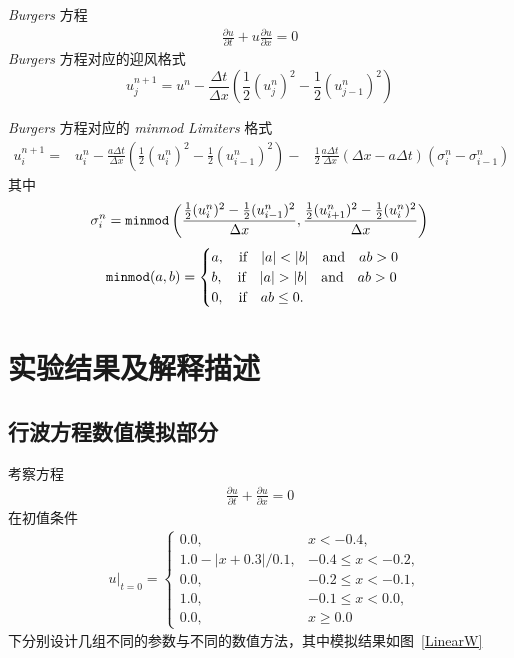 \documentclass[10.5pt
]{article}
\begin{document}
\textit{Burgers} 方程
\begin{align}
\frac{\partial u}{\partial t} + u \frac{\partial u}{\partial x} = 0
\end{align}
\textit{Burgers} 方程对应的迎风格式
\begin{equation}
u_j^{n+1} = u^n - \frac{\Delta t}{\Delta x} \left( \frac{1}{2} (u_j^n)^2 - \frac{1}{2} (u_{j-1}^n)^2\right)
\end{equation}

\textit{Burgers} 方程对应的 \textit{minmod Limiters} 格式
\begin{equation}
\begin{aligned}
u_i^{n+1}=&
  u_i^n-\frac{a \Delta t}{\Delta x}\left( \frac{1}{2} (u_i^n)^2- \frac{1}{2} (u_{i-1}^n)^2 \right)-
 &\frac{1}{2} \frac{a \Delta t}{\Delta x}(\Delta x-a \Delta t)\left(\sigma_i^n-\sigma_{i-1}^n\right)
\end{aligned}
\end{equation}
其中
\begin{equation}
	\sigma_i^n = \verb|minmod| \left( \frac{ \frac{1}{2} (u_i^n)^2 - \frac{1}{2} (u_{i-1}^{n})^2 }{ \Delta x }, \frac{ \frac{1}{2} (u_{i+1}^n)^2 - \frac{1}{2} (u_{i}^{n})^2}{ \Delta x } \right)
\end{equation}
\begin{equation}
	\verb|minmod|(a, b) = 
	\begin{cases}
		a, \qif |a| < |b| \qand ab > 0\\
		b, \qif |a| > |b| \qand ab > 0\\
		0, \qif ab \leq 0.
	\end{cases}
\end{equation}


\section{实验结果及解释描述}
\subsection{行波方程数值模拟部分}
考察方程
\begin{align}
\frac{\partial u}{\partial t} + \frac{\partial u}{\partial x} = 0
\end{align}
在初值条件
\begin{align}
& u|_{t=0} = \left\{\begin{array}{ll} 0.0, & x < -0.4, \\
1.0 - |x + 0.3| / 0.1, & -0.4 \le x < -0.2, \\
0.0, & -0.2 \le x < -0.1, \\
1.0 , & -0.1 \le x < 0.0, \\
0.0, & x \ge 0.0
\end{array}\right.
\end{align}
下分别设计几组不同的参数与不同的数值方法，其中模拟结果如图~\ref{LinearW}
\end{document}
